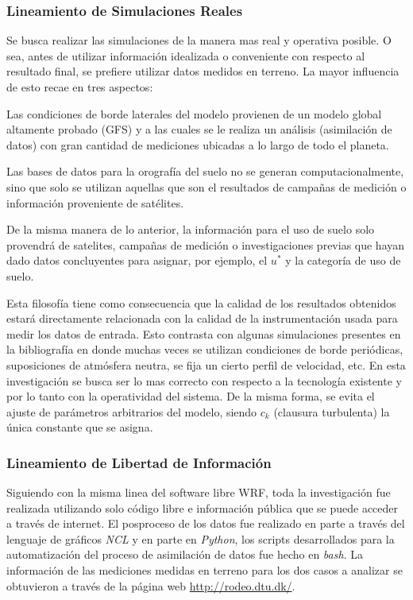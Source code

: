 \subsubsection{Lineamiento de Simulaciones Reales}
Se busca realizar las simulaciones de la manera mas real y operativa posible. O sea, antes de utilizar información idealizada o conveniente con respecto al resultado final, se prefiere utilizar datos medidos en terreno. La mayor influencia de esto recae en tres aspectos:
\begin{enumerate*}
	\item Las condiciones de borde laterales del modelo provienen de un modelo global altamente probado (GFS) y a las cuales se le realiza un análisis (asimilación de datos) con  gran cantidad de mediciones ubicadas a lo largo de todo el planeta.
	\item Las bases de datos para la orografía del suelo no se generan computacionalmente, sino que solo se utilizan aquellas que son el resultados de campañas de medición o información proveniente de satélites.
	\item De la misma manera de lo anterior, la información para el uso de suelo solo provendrá de satelites, campañas de medición o investigaciones previas que hayan dado datos concluyentes para asignar, por ejemplo, el $u^*$ y la categoría de uso de suelo.
\end{enumerate*}
Esta filosofía tiene como consecuencia que la calidad de los resultados obtenidos estará directamente relacionada con la calidad de la instrumentación usada para medir los datos de entrada. Esto contrasta con algunas simulaciones presentes en la bibliografía en donde muchas veces se utilizan condiciones de borde periódicas, suposiciones de atmósfera neutra, se fija un cierto perfil de velocidad, etc. En esta investigación se busca ser lo mas correcto con respecto a la tecnología existente y por lo tanto con la operatividad del sistema. De la misma forma, se evita el ajuste de parámetros arbitrarios del modelo, siendo $c_k$ (clausura turbulenta) la única constante que se asigna.
\subsubsection{Lineamiento de Libertad de Información}
Siguiendo con la misma linea del software libre WRF, toda la investigación fue realizada utilizando solo código libre e información pública que se puede acceder a través de internet. El posproceso de los datos fue realizado en parte a través del lenguaje de gráficos \emph{NCL} y en parte en \emph{Python}, los scripts desarrollados para la automatización del proceso de asimilación de datos fue hecho en \emph{bash}. La información de las mediciones medidas en terreno para los dos casos a analizar se obtuvieron a través de la página web \url{http://rodeo.dtu.dk/}.
